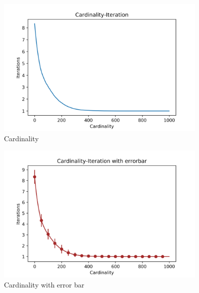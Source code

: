 \documentclass[a4paper,12pt]{article}
\begin{document}
    \begin{figure}[H]
    	\centering
    	\includegraphics[width=0.9\textwidth]{Card50_4_1000_300}
    	\caption{Cardinality}\label{Card50_4_1000_300}
    \end{figure}
    \begin{figure}[H]
    	\centering
    	\includegraphics[width=0.9\textwidth]{CardErr50_4_1000_300}
    	\caption{Cardinality with error bar}\label{CardErr50_4_1000_300}
    \end{figure}
\end{document}
